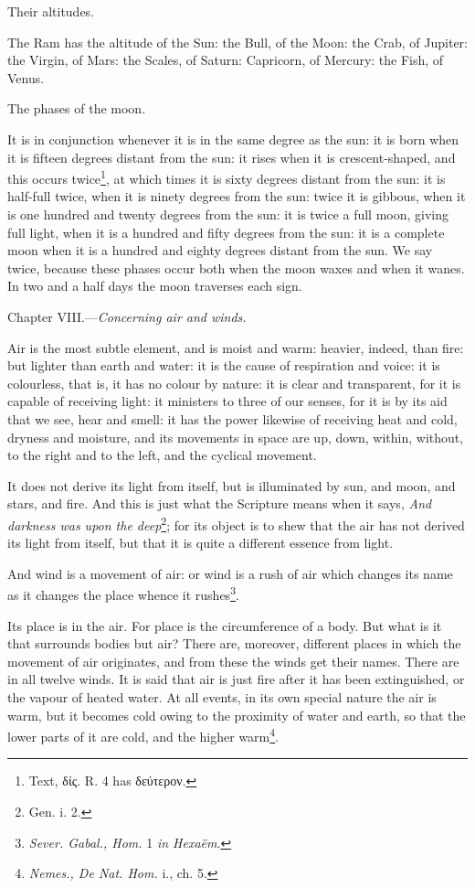 Their altitudes.

The Ram has the altitude of the Sun: the Bull, of the Moon: the Crab, of Jupiter: the Virgin, of Mars: the Scales, of Saturn: Capricorn, of Mercury: the Fish, of Venus.

The phases of the moon.

It is in conjunction whenever it is in the same degree as the sun: it is born when it is fifteen degrees distant from the sun: it rises when it is crescent-shaped, and this occurs twice\footnote{Text, \textgreek{δίς}. R. 4 has \textgreek{δεύτερον}.}, at which times it is sixty degrees distant from the sun: it is half-full twice, when it is ninety degrees from the sun: twice it is gibbous, when it is one hundred and twenty degrees from the sun: it is twice a full moon, giving full light, when it is a hundred and fifty degrees from the sun: it is a complete moon when it is a hundred and eighty degrees distant from the sun. We say twice, because these phases occur both when the moon waxes and when it wanes. In two and a half days the moon traverses each sign.


Chapter VIII.—\emph{Concerning air and winds.}

Air is the most subtle element, and is moist and warm: heavier, indeed, than fire: but lighter than earth and water: it is the cause of respiration and voice: it is colourless, that is, it has no colour by nature: it is clear and transparent, for it is capable of receiving light: it ministers to three of our senses, for it is by its aid that we see, hear and smell: it has the power likewise of receiving heat and cold, dryness and moisture, and its movements in space are up, down, within, without, to the right and to the left, and the cyclical movement.

It does not derive its light from itself, but is illuminated by sun, and moon, and stars, and fire. And this is just what the Scripture means when it says, \emph{And darkness was upon the deep}\footnote{Gen. i. 2.}; for its object is to shew that the air has not derived its light from itself, but that it is quite a different essence from light.

And wind is a movement of air: or wind is a rush of air which changes its name as it changes the place whence it rushes\footnote{\emph{Sever. Gabal., Hom. }1 \emph{in Hexaëm}.}.

Its place is in the air. For place is the circumference of a body. But what is it that surrounds bodies but air? There are, moreover, different places in which the movement of air originates, and from these the winds get their names. There are in all twelve winds. It is said that air is just fire after it has been extinguished, or the vapour of heated water. At all events, in its own special nature the air is warm, but it becomes cold owing to the proximity of water and earth, so that the lower parts of it are cold, and the higher warm\footnote{\emph{Nemes., De Nat. Hom. }i., ch. 5.}.

